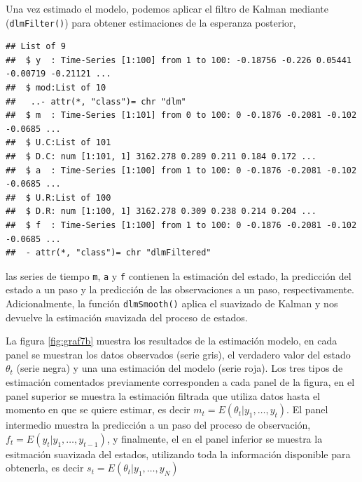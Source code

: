 \documentclass[12pt]{article}\usepackage[]{graphicx}\usepackage[]{color}
\makeatletter
\newenvironment{kframe}{%
 \def\at@end@of@kframe{}%
 \ifinner\ifhmode%
  \def\at@end@of@kframe{\end{minipage}}%
  \begin{minipage}{\columnwidth}%
 \fi\fi%
 \def\FrameCommand##1{\hskip\@totalleftmargin \hskip-\fboxsep
 \colorbox{shadecolor}{##1}\hskip-\fboxsep
     \hskip-\linewidth \hskip-\@totalleftmargin \hskip\columnwidth}%
 \MakeFramed {\advance\hsize-\width
   \@totalleftmargin\z@ \linewidth\hsize
   \@setminipage}}%
 {\par\unskip\endMakeFramed%
 \at@end@of@kframe}
\newenvironment{knitrout}{}{} %
\makeatother
\begin{document}
Una vez estimado el modelo, podemos aplicar el filtro de Kalman mediante (\verb|dlmFilter()|) para obtener estimaciones de la esperanza posterior, 
\begin{knitrout}
\color{fgcolor}\begin{kframe}
\begin{verbatim}
## List of 9
##  $ y  : Time-Series [1:100] from 1 to 100: -0.18756 -0.226 0.05441 -0.00719 -0.21121 ...
##  $ mod:List of 10
##   ..- attr(*, "class")= chr "dlm"
##  $ m  : Time-Series [1:101] from 0 to 100: 0 -0.1876 -0.2081 -0.102 -0.0685 ...
##  $ U.C:List of 101
##  $ D.C: num [1:101, 1] 3162.278 0.289 0.211 0.184 0.172 ...
##  $ a  : Time-Series [1:100] from 1 to 100: 0 -0.1876 -0.2081 -0.102 -0.0685 ...
##  $ U.R:List of 100
##  $ D.R: num [1:100, 1] 3162.278 0.309 0.238 0.214 0.204 ...
##  $ f  : Time-Series [1:100] from 1 to 100: 0 -0.1876 -0.2081 -0.102 -0.0685 ...
##  - attr(*, "class")= chr "dlmFiltered"
\end{verbatim}
\end{kframe}
\end{knitrout}
las series de tiempo \verb|m|, \verb|a| y \verb|f| contienen la estimación del estado, la predicción del estado a un paso y la predicción de las observaciones a un paso, respectivamente. Adicionalmente, la función \verb|dlmSmooth()| aplica el suavizado de Kalman y nos devuelve la estimación suavizada del proceso de estados. 

La figura \ref{fig:graf7b} muestra los resultados de la estimación modelo, en cada panel se muestran los datos observados (serie gris), el verdadero valor del estado $\theta_t$ (serie negra) y una una estimación del modelo (serie roja). Los tres tipos de estimación comentados previamente corresponden a cada panel de la figura, en el panel superior se muestra la estimación filtrada que utiliza datos hasta el momento en que se quiere estimar, es decir $m_t = E(\theta_t | y_1,\ldots, y_t)$. El panel intermedio muestra la predicción a un paso del proceso de observación, $f_t = E(y_t | y_1, \ldots, y_{t-1})$, y finalmente, el en el panel inferior se muestra la esitmación suavizada del estados, utilizando toda la información disponible para obtenerla, es decir $s_t = E(\theta_t | y_1, \ldots, y_N)$
\end{document}
